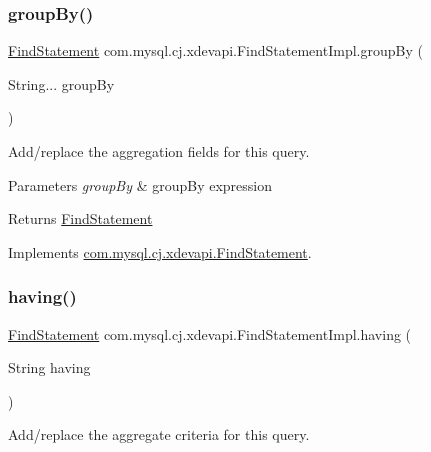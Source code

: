 \subsubsection{\texorpdfstring{group\+By()}{groupBy()}}
{\footnotesize\ttfamily \mbox{\hyperlink{interfacecom_1_1mysql_1_1cj_1_1xdevapi_1_1_find_statement}{Find\+Statement}} com.\+mysql.\+cj.\+xdevapi.\+Find\+Statement\+Impl.\+group\+By (\begin{DoxyParamCaption}\item[{String...}]{group\+By }\end{DoxyParamCaption})}

Add/replace the aggregation fields for this query.


\begin{DoxyParams}{Parameters}
{\em group\+By} & group\+By expression \\
\hline
\end{DoxyParams}
\begin{DoxyReturn}{Returns}
\mbox{\hyperlink{interfacecom_1_1mysql_1_1cj_1_1xdevapi_1_1_find_statement}{Find\+Statement}} 
\end{DoxyReturn}


Implements \mbox{\hyperlink{interfacecom_1_1mysql_1_1cj_1_1xdevapi_1_1_find_statement_a05535b09958e5196723d4eb8911f0360}{com.\+mysql.\+cj.\+xdevapi.\+Find\+Statement}}.

\mbox{\label{classcom_1_1mysql_1_1cj_1_1xdevapi_1_1_find_statement_impl_aa5772a01729fde08c5959498e56b5448}} 
\subsubsection{\texorpdfstring{having()}{having()}}
{\footnotesize\ttfamily \mbox{\hyperlink{interfacecom_1_1mysql_1_1cj_1_1xdevapi_1_1_find_statement}{Find\+Statement}} com.\+mysql.\+cj.\+xdevapi.\+Find\+Statement\+Impl.\+having (\begin{DoxyParamCaption}\item[{String}]{having }\end{DoxyParamCaption})}

Add/replace the aggregate criteria for this query.


